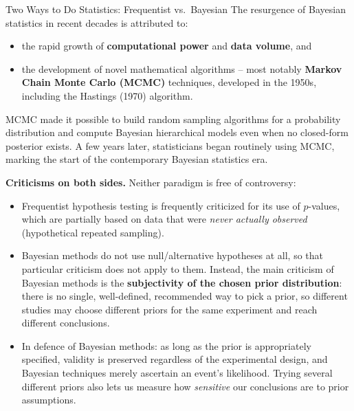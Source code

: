 \documentclass[aspectratio=169,10pt]{beamer}
\begin{document}
\begin{frame}[allowframebreaks]{Two Ways to Do Statistics: Frequentist vs.\ Bayesian}
  The resurgence of Bayesian statistics in recent decades is attributed to:
  \begin{itemize}
    \item the rapid growth of \textbf{computational power} and \textbf{data
      volume}, and
    \item the development of novel mathematical algorithms -- most notably
      \textbf{Markov Chain Monte Carlo (MCMC)} techniques, developed in the
      1950s, including the Hastings (1970) algorithm.
  \end{itemize}
  MCMC made it possible to build random sampling algorithms for a probability
  distribution and compute Bayesian hierarchical models even when no
  closed-form posterior exists. A few years later, statisticians began
  routinely using MCMC, marking the start of the contemporary Bayesian
  statistics era.

  \framebreak

  \textbf{Criticisms on both sides.} Neither paradigm is free of
  controversy:
  \begin{itemize}
    \item Frequentist hypothesis testing is frequently criticized for its use
      of $p$-values, which are partially based on data that were
      \emph{never actually observed} (hypothetical repeated sampling).
    \item Bayesian methods do not use null/alternative hypotheses at all, so
      that particular criticism does not apply to them. Instead, the main
      criticism of Bayesian methods is the \textbf{subjectivity of the
      chosen prior distribution}: there is no single, well-defined,
      recommended way to pick a prior, so different studies may choose
      different priors for the same experiment and reach different
      conclusions.
    \item In defence of Bayesian methods: as long as the prior is
      appropriately specified, validity is preserved regardless of the
      experimental design, and Bayesian techniques merely ascertain an
      event's likelihood. Trying several different priors also lets us
      measure how \emph{sensitive} our conclusions are to prior
      assumptions.
  \end{itemize}

  \framebreak


\end{frame}
\end{document}
